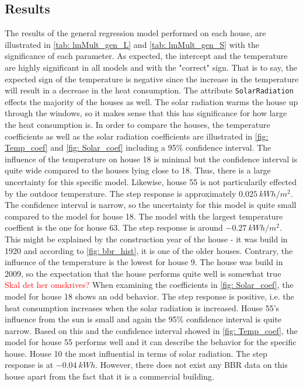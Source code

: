 \subsection{Results}
The results of the general regression model performed on each house, are illustrated in \cref{tab: lmMult_gen_L} and \cref{tab: lmMult_gen_S} with the significance of each parameter. As expected, the intercept and the temperature are highly significant in all models and with the "correct" sign. That is to say, the expected sign of the temperature is negative since the increase in the temperature will result in a decrease in the heat consumption. The attribute \texttt{SolarRadiation} effects the majority of the houses as well. The solar radiation warms the house up through the windows, so it makes sense that this has significance for how large the heat consumption is. In order to compare the houses, the temperature coefficients as well as the solar radiation coefficients are illustrated in \cref{fig: Temp_coef} and \cref{fig: Solar_coef} including a 95\% confidence interval. The influence of the temperature on house 18 is minimal but the confidence interval is quite wide compared to the houses lying close to 18. Thus, there is a large uncertainty for this specific model. Likewise, house 55 is not particularily effected by the outdoor temperature. The step response is approximately $0.025 \ kWh/m^2$. The confidence interval is narrow, so the uncertainty for this model is quite small compared to the model for house 18. The model with the largest temperature coeffient is the one for house 63. The step response is around $-0.27 \ kWh/m^2$. This might be explained by the construction year of the house - it was build in 1920 and according to \cref{fig: bbr_hist}, it is one of the older houses. Contrary, the influence of the temperature is the lowest for house 9. The house was build in 2009, so the expectation that the house performs quite well is somewhat true \textcolor{red}{Skal det her omskrives?} When examining the coefficients in \cref{fig: Solar_coef}, the model for house 18 shows an odd behavior. The step response is positive, i.e. the heat consumption increases when the solar radiation is increased. House 55's influence from the sun is small and again the 95\% confidence interval is quite narrow. Based on this and the confidence interval showed in \cref{fig: Temp_coef}, the model for house 55 performs well and it can describe the behavior for the specific house. House 10 the most influential in terms of solar radiation. The step response is at $-0.04 \ kWh$. However, there does not exist any BBR data on this house apart from the fact that it is a commercial building.\\ 
